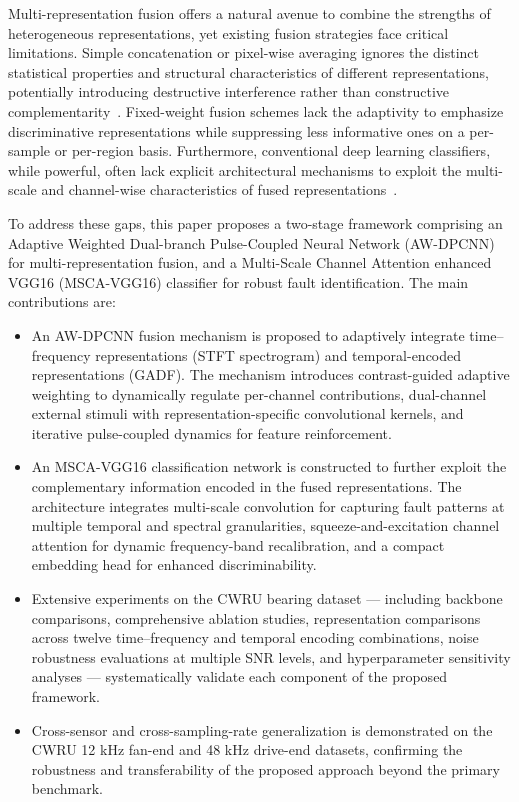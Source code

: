 \documentclass[journal]{IEEEtran}
\begin{document}
Multi-representation fusion offers a natural avenue to combine the strengths of heterogeneous representations, yet existing fusion strategies face critical limitations. Simple concatenation or pixel-wise averaging ignores the distinct statistical properties and structural characteristics of different representations, potentially introducing destructive interference rather than constructive complementarity~\cite{9408662}. Fixed-weight fusion schemes lack the adaptivity to emphasize discriminative representations while suppressing less informative ones on a per-sample or per-region basis. Furthermore, conventional deep learning classifiers, while powerful, often lack explicit architectural mechanisms to exploit the multi-scale and channel-wise characteristics of fused representations~\cite{9832890}.

To address these gaps, this paper proposes a two-stage framework comprising an Adaptive Weighted Dual-branch Pulse-Coupled Neural Network (AW-DPCNN) for multi-representation fusion, and a Multi-Scale Channel Attention enhanced VGG16 (MSCA-VGG16) classifier for robust fault identification. The main contributions are:

\begin{itemize}
\item An AW-DPCNN fusion mechanism is proposed to adaptively integrate time--frequency representations (STFT spectrogram) and temporal-encoded representations (GADF). The mechanism introduces contrast-guided adaptive weighting to dynamically regulate per-channel contributions, dual-channel external stimuli with representation-specific convolutional kernels, and iterative pulse-coupled dynamics for feature reinforcement.

\item An MSCA-VGG16 classification network is constructed to further exploit the complementary information encoded in the fused representations. The architecture integrates multi-scale convolution for capturing fault patterns at multiple temporal and spectral granularities, squeeze-and-excitation channel attention for dynamic frequency-band recalibration, and a compact embedding head for enhanced discriminability.

\item Extensive experiments on the CWRU bearing dataset — including backbone comparisons, comprehensive ablation studies, representation comparisons across twelve time--frequency and temporal encoding combinations, noise robustness evaluations at multiple SNR levels, and hyperparameter sensitivity analyses — systematically validate each component of the proposed framework.

\item Cross-sensor and cross-sampling-rate generalization is demonstrated on the CWRU 12 kHz fan-end and 48 kHz drive-end datasets, confirming the robustness and transferability of the proposed approach beyond the primary benchmark.

\end{itemize}
\end{document}
